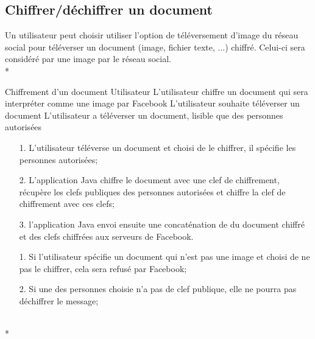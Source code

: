 \documentclass[a4paper,11pt,french]{article}
\begin{document}
\subsection{Chiffrer/déchiffrer un document}
Un utilisateur peut choisir utiliser l'option de téléversement
d'image du réseau social pour téléverser un document (image, 
fichier texte, ...) chiffré. Celui-ci sera considéré par une image
par le réseau social.\\*

\fiche
	{Chiffrement d'un document}
	{Utilisateur}
	{L'utilisateur chiffre un document qui sera interpréter comme une image 
        par Facebook}
	{}
	{L'utilisateur souhaite téléverser un document}
	{L'utilisateur a téléverser un document, lisible que des personnes 
        autorisées}
	{\begin{itemize}
	    \item[]
	  \item[1.] L'utilisateur téléverse un document et choisi de le chiffrer,
          il spécifie les personnes autorisées;
	\end{itemize}
	}
	{\begin{itemize}
        \item[]
		\item[2.] L'application Java chiffre le document avec une clef 
        de chiffrement, récupère les clefs publiques
        des personnes autorisées et chiffre la clef de chiffrement
        avec ces clefs;
		\item[3.] l'application Java envoi ensuite une concaténation de 
        du document chiffré et des clefs chiffrées aux serveurs de Facebook.
	\end{itemize}
	}
	{}
\flots
    {\begin{itemize}
    \item[]
    \item[1.] Si l'utilisateur spécifie un document qui n'est pas une image
    et choisi de ne pas le chiffrer, cela sera refusé par Facebook;
    \item[2.] Si une des personnes choisie n'a pas de clef publique,
        elle ne pourra pas déchiffrer le message;
    \end{itemize}
    }
	{}    
\\*
\end{document}
